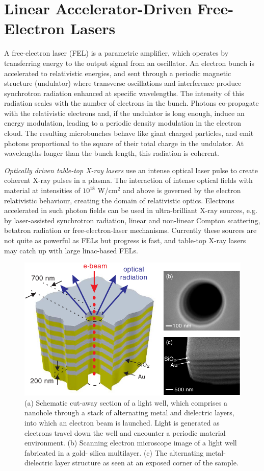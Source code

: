 \section{Linear Accelerator-Driven Free-Electron Lasers}
 
A free-electron laser (FEL) is a parametric amplifier, which operates by
transferring energy to the output signal from an oscillator. An electron bunch
is accelerated to relativistic energies, and sent through a periodic magnetic
structure (undulator) where transverse oscillations and interference produce
synchrotron radiation enhanced at specific wavelengths. The intensity of this
radiation scales with the number of electrons in the bunch. Photons co-propagate
with the relativistic electrons and, if the undulator is long enough, induce an
energy modulation, leading to a periodic density modulation in the electron
cloud. The resulting microbunches behave like giant charged particles, and emit
photons proportional to the square of their total charge in the undulator. At
wavelengths longer than the bunch length, this radiation is coherent.

{\em Optically driven table-top X-ray lasers} use an intense optical laser pulse to
create coherent X-ray pulses in a plasma. The interaction of intense optical
fields with material at intensities of $10^{18}$ W/cm$^2$ and above is governed by the
electron relativistic behaviour, creating the domain of relativistic
optics. Electrons accelerated in such photon fields can be used in
ultra-brilliant X-ray sources, e.g. by laser-assisted synchrotron radiation,
linear and non-linear Compton scattering, betatron radiation or
free-electron-laser mechanisms. 
Currently these sources are not quite as powerful as FELs but
progress is fast, and table-top X-ray lasers may catch up with large linac-based
FELs. 

\begin{figure}[h]
\centering
  \includegraphics[width=0.6 \columnwidth]{FEL_on_a_chip.png}
  \caption{(a) Schematic cut-away section of a light
well, which comprises a nanohole through a stack of alternating
metal and dielectric layers, into which an electron beam is
launched. Light is generated as electrons travel down the well
and encounter a periodic material environment. (b) Scanning
electron microscope image of a light well fabricated in a gold-
silica multilayer. (c) The alternating metal-dielectric layer structure as seen
at an exposed corner of the sample. \cite{Adamo2009Light} 
}
\label{Fig:FEL_Chip}
\end{figure} 

